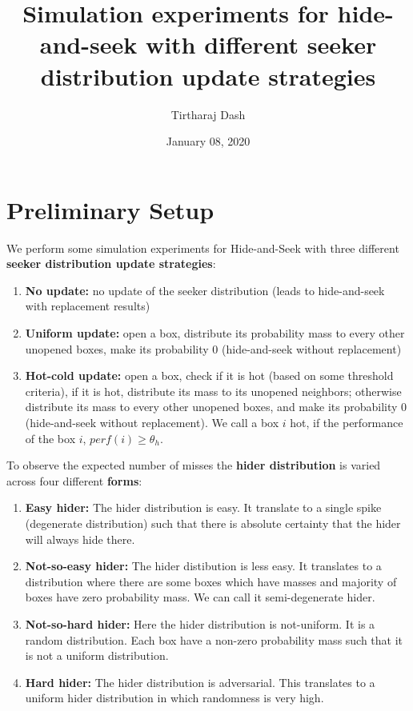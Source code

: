 \documentclass[11pt,a4paper,draft]{article}
\title{Simulation experiments for hide-and-seek with different seeker distribution update strategies}
\author{Tirtharaj Dash}
\date{January 08, 2020}
\begin{document}
\maketitle

\section{Preliminary Setup}

\noindent
We perform some simulation experiments for Hide-and-Seek with three different \textbf{seeker distribution update strategies}:
\begin{enumerate}[(1)]
	\item \textbf{No update:} no update of the seeker distribution (leads to hide-and-seek with replacement results)
	\item \textbf{Uniform update:} open a box, distribute its probability mass to every other unopened boxes, make its probability 0 (hide-and-seek without replacement)
	\item \textbf{Hot-cold update:} open a box, check if it is hot (based on some threshold criteria), if it is hot, distribute its mass to its unopened neighbors; otherwise distribute its mass to every other unopened boxes, and make its probability 0 (hide-and-seek without replacement). We call a box $i$ hot, if the performance of the box $i$, $perf(i) \geq \theta_h$.
\end{enumerate}

\noindent
To observe the expected number of misses the \textbf{hider distribution} is varied across four different \textbf{forms}:
\begin{enumerate}[(1)]
	\item \textbf{Easy hider:} The hider distribution is easy. It translate to a single spike (degenerate distribution) such that there is absolute certainty that the hider will always hide there.
	\item \textbf{Not-so-easy hider:} The hider distibution is less easy. It translates to a distribution where there are some boxes which have masses and majority of boxes have zero probability mass. We can call it semi-degenerate hider.
	\item \textbf{Not-so-hard hider:} Here the hider distribution is not-uniform. It is a random distribution. Each box have a non-zero probability mass such that it is not a uniform distribution.
	\item \textbf{Hard hider:} The hider distribution is adversarial. This translates to a uniform hider distribution in which randomness is very high.
\end{enumerate}
\end{document}
